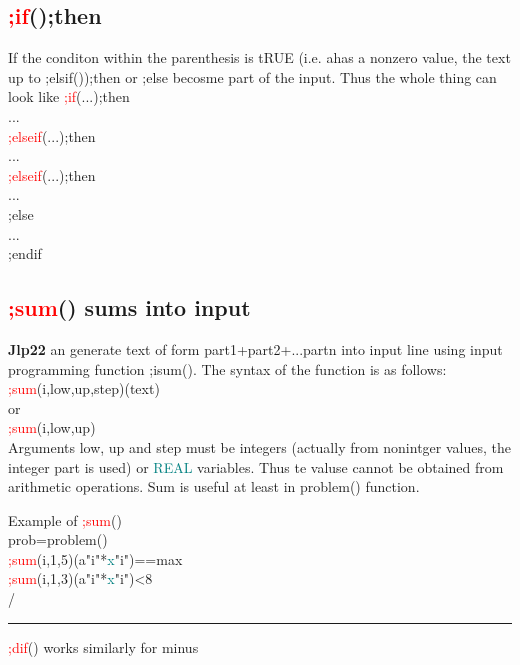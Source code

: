 \subsection{\textcolor{Red}{;if}();then} 
\label{inpuifthen} 
If the conditon within the parenthesis is tRUE (i.e. ahas a nonzero value, the text up to 
;elsif());then or ;else  becosme part of the input. Thus the whole thing can look like 
\textcolor{Red}{;if}(...);then\\ 
...\\ 
\textcolor{Red}{;elseif}(...);then\\ 
...\\ 
\textcolor{Red}{;elseif}(...);then\\ 
...\\ 
;else\\ 
...\\ 
;endif\\ 
\subsection{\textcolor{Red}{;sum}() sums into input} 
\label{inpusum} 
\textbf{Jlp22} an generate text of form part1+part2+...partn into input line using 
input programming function ;isum(). The syntax of the function is as follows:\\ 
\textcolor{Red}{;sum}(i,low,up,step)(text)\\ 
or \\ 
\textcolor{Red}{;sum}(i,low,up)\\ 
Arguments low, up and step must be integers (actually from nonintger values, the 
integer part is used) or \textcolor{teal}{REAL} variables. Thus te valuse cannot be obtained 
from arithmetic operations. Sum is useful at least in \textcolor{VioletRed}{problem}() function. 
\singlespacing 
\begin{example}[inpusumex]Example of \textcolor{Red}{;sum}()\\ 
\label{inpusumex} 
\noindent prob=\textcolor{VioletRed}{problem}()\\ 
\textcolor{Red}{;sum}(i,1,5)(a"i"*\textcolor{teal}{x}"i")==max\\ 
\textcolor{Red}{;sum}(i,1,3)(a"i"*\textcolor{teal}{x}"i")<8\\ 
/                                                          \\ 
\end{example} 
\vspace{-7mm} \rule{5cm}{0.1pt} 
\onehalfspacing 
\begin{note} 
\textcolor{Red}{;dif}() works similarly for minus 
\end{note} 
